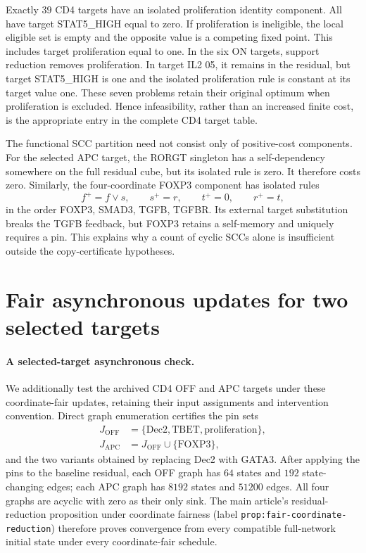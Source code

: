 Exactly $39$ CD4 targets have an isolated proliferation identity component.
All have target STAT5\_HIGH equal to zero. If proliferation is ineligible,
the local eligible set is empty and the opposite value is a competing
fixed point. This includes target proliferation equal to one. In the six
ON targets, support reduction removes proliferation. In target IL2 05,
it remains in the residual, but target STAT5\_HIGH is one and the
isolated proliferation rule is constant at its target value one. These
seven problems retain their original optimum when proliferation is
excluded. Hence infeasibility,
rather than an increased finite cost, is the appropriate entry in
the complete CD4 target table.

The functional SCC partition need not consist only of positive-cost
components. For the selected APC target, the RORGT singleton has a
self-dependency somewhere on the full residual cube, but its isolated
rule is zero. It therefore costs zero. Similarly, the four-coordinate
FOXP3 component has isolated rules
\[
 f^+=f\vee s,\qquad s^+=r,\qquad t^+=0,\qquad r^+=t,
\]
in the order FOXP3, SMAD3, TGFB, TGFBR. Its external target substitution
breaks the TGFB feedback, but FOXP3 retains a self-memory and uniquely
requires a pin. This explains why a count of cyclic SCCs alone is
insufficient outside the copy-certificate hypotheses.

\section{Fair asynchronous updates for two selected targets}\label{sec:fairupdates}


\paragraph{A selected-target asynchronous check.}
We additionally test the archived CD4 OFF and APC targets under these
coordinate-fair updates, retaining their input assignments and intervention
convention. Direct graph enumeration certifies the pin sets
\[
\begin{aligned}
J_{\mathrm{OFF}}&=\{\mathrm{Dec2},\mathrm{TBET},\mathrm{proliferation}\},\\
J_{\mathrm{APC}}&=J_{\mathrm{OFF}}\cup\{\mathrm{FOXP3}\},
\end{aligned}
\]
and the two variants obtained by replacing Dec2 with GATA3. After applying
the pins to the baseline residual, each OFF graph has $64$ states and
$192$ state-changing edges; each APC graph has $8192$ states and $51200$
edges. All four graphs are acyclic with zero as their only sink.
The main article's residual-reduction proposition under coordinate fairness
(label \texttt{prop:fair-coordinate-reduction}) therefore proves convergence from every
compatible full-network initial state under every coordinate-fair schedule.


